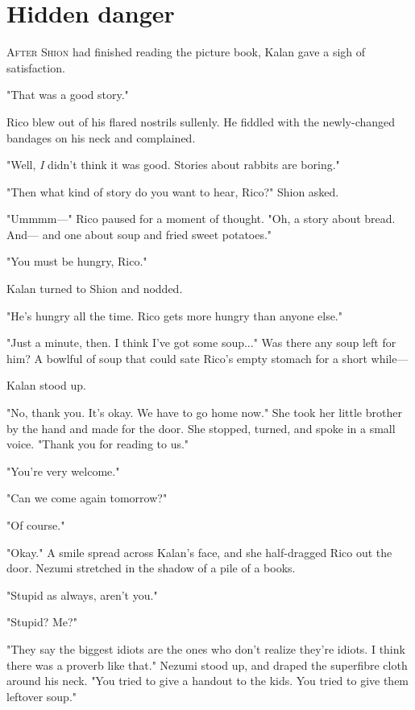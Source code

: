 
\chapter{Hidden danger}


\lettrine{A}{fter Shion} had finished reading the picture book, Kalan gave a sigh of
satisfaction.

"That was a good story."

Rico blew out of his flared nostrils sullenly. He fiddled with the
newly-changed bandages on his neck and complained.

"Well, \emph{I} didn't think it was good. Stories about rabbits are boring."

"Then what kind of story do you want to hear, Rico?" Shion asked.

"Ummmm---" Rico paused for a moment of thought. "Oh, a story about bread.
And--- and one about soup and fried sweet potatoes."

"You must be hungry, Rico."

Kalan turned to Shion and nodded.

"He's hungry all the time. Rico gets more hungry than anyone else."

"Just a minute, then. I think I've got some soup..." Was there any soup
left for him? A bowlful of soup that could sate Rico's empty stomach for
a short while---

Kalan stood up.

"No, thank you. It's okay. We have to go home now." She took her little
brother by the hand and made for the door. She stopped, turned, and
spoke in a small voice. "Thank you for reading to us."

"You're very welcome."

"Can we come again tomorrow?"

"Of course."

"Okay." A smile spread across Kalan's face, and she half-dragged Rico
out the door. Nezumi stretched in the shadow of a pile of a books.

"Stupid as always, aren't you."

"Stupid? Me?"

"They say the biggest idiots are the ones who don't realize they're
idiots. I think there was a proverb like that." Nezumi stood up, and
draped the superfibre cloth around his neck. "You tried to give a
handout to the kids. You tried to give them leftover soup."

